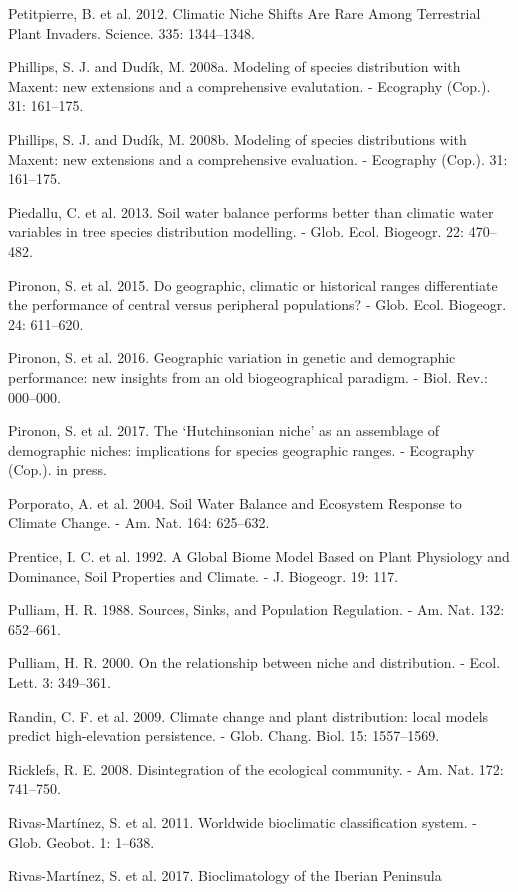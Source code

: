 \documentclass[11pt,twoside]{reedthesis}
\begin{document}
Petitpierre, B. et al. 2012. Climatic Niche Shifts Are Rare Among
Terrestrial Plant Invaders. Science. 335: 1344--1348.\par
Phillips, S. J. and Dudík, M. 2008a. Modeling of species distribution
with Maxent: new extensions and a comprehensive evalutation. - Ecography
(Cop.). 31: 161--175.\par
Phillips, S. J. and Dudík, M. 2008b. Modeling of species distributions
with Maxent: new extensions and a comprehensive evaluation. - Ecography
(Cop.). 31: 161--175.\par
Piedallu, C. et al. 2013. Soil water balance performs better than
climatic water variables in tree species distribution modelling. - Glob.
Ecol. Biogeogr. 22: 470--482.\par
Pironon, S. et al. 2015. Do geographic, climatic or historical ranges
differentiate the performance of central versus peripheral populations?
- Glob. Ecol. Biogeogr. 24: 611--620.\par
Pironon, S. et al. 2016. Geographic variation in genetic and demographic
performance: new insights from an old biogeographical paradigm. - Biol.
Rev.: 000--000.\par
Pironon, S. et al. 2017. The `Hutchinsonian niche' as an assemblage of
demographic niches: implications for species geographic ranges. -
Ecography (Cop.). in press.\par
Porporato, A. et al. 2004. Soil Water Balance and Ecosystem Response to
Climate Change. - Am. Nat. 164: 625--632.\par
Prentice, I. C. et al. 1992. A Global Biome Model Based on Plant
Physiology and Dominance, Soil Properties and Climate. - J. Biogeogr.
19: 117.\par
Pulliam, H. R. 1988. Sources, Sinks, and Population Regulation. - Am.
Nat. 132: 652--661.\par
Pulliam, H. R. 2000. On the relationship between niche and distribution.
- Ecol. Lett. 3: 349--361.\par
Randin, C. F. et al. 2009. Climate change and plant distribution: local
models predict high-elevation persistence. - Glob. Chang. Biol. 15:
1557--1569.\par
Ricklefs, R. E. 2008. Disintegration of the ecological community. - Am.
Nat. 172: 741--750.\par
Rivas-Martínez, S. et al. 2011. Worldwide bioclimatic classification
system. - Glob. Geobot. 1: 1--638.\par
Rivas-Martínez, S. et al. 2017. Bioclimatology of the Iberian Peninsula
\end{document}
